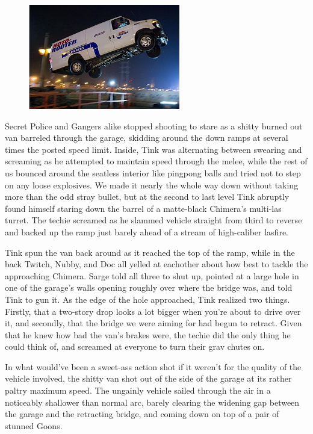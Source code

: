 \begin{figure}
	\begin{center}
		\includegraphics[width=\figwidth]{pics/18/56.png}
	\end{center}
\end{figure}
Secret Police and Gangers alike stopped shooting to stare as a shitty burned out van barreled through the garage, skidding around the down ramps at several times the posted speed limit. 
Inside, Tink was alternating between swearing and screaming as he attempted to maintain speed through the melee, while the rest of us bounced around the seatless interior like pingpong balls and tried not to step on any loose explosives. 
We made it nearly the whole way down without taking more than the odd stray bullet, but at the second to last level Tink abruptly found himself staring down the barrel of a matte-black Chimera's multi-las turret. 
The techie screamed as he slammed vehicle straight from third to reverse and backed up the ramp just barely ahead of a stream of high-caliber lasfire.

Tink spun the van back around as it reached the top of the ramp, while in the back Twitch, Nubby, and Doc all yelled at eachother about how best to tackle the approaching Chimera. 
Sarge told all three to shut up, pointed at a large hole in one of the garage's walls opening roughly over where the bridge was, and told Tink to gun it. 
As the edge of the hole approached, Tink realized two things. 
Firstly, that a two-story drop looks a lot bigger when you're about to drive over it, and secondly, that the bridge we were aiming for had begun to retract. 
Given that he knew how bad the van's brakes were, the techie did the only thing he could think of, and screamed at everyone to turn their grav chutes on. 


In what would've been a sweet-ass action shot if it weren't for the quality of the vehicle involved, the shitty van shot out of the side of the garage at its rather paltry maximum speed. 
The ungainly vehicle sailed through the air in a noticeably shallower than normal arc, barely clearing the widening gap between the garage and the retracting bridge, and coming down on top of a pair of stunned Goons.


